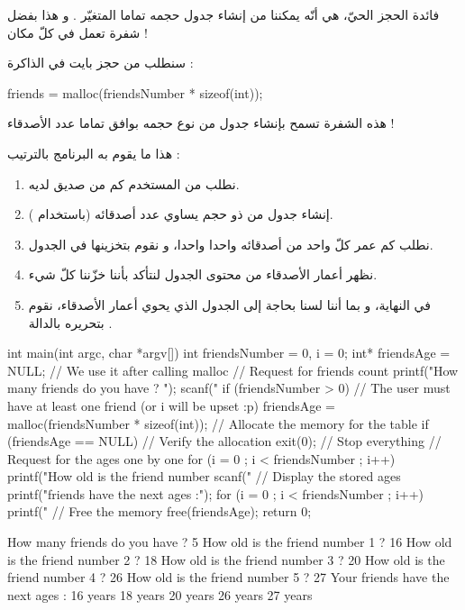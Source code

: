 فائدة الحجز الحيّ، هي أنّه يمكننا من إنشاء جدول حجمه تماما المتغيّر
.
و هذا بفضل شفرة تعمل في كلّ مكان !

سنطلب من
حجز
بايت في الذاكرة :

\begin{Csource}
friends = malloc(friendsNumber * sizeof(int));
\end{Csource}

هذه الشفرة تسمح بإنشاء جدول من نوع
حجمه بوافق تماما عدد الأصدقاء !

هذا ما يقوم به البرنامج بالترتيب :

\begin{enumerate}
  \item نطلب من المستخدم كم من صديق لديه.
  \item إنشاء جدول من
ذو حجم يساوي عدد أصدقائه (باستخدام
).
  \item نطلب كم عمر كلّ واحد من أصدقائه واحدا واحدا، و نقوم بتخزينها في الجدول.
  \item نظهر أعمار الأصدقاء من محتوى الجدول لنتأكد بأننا خزّننا كلّ شيء.
  \item في النهاية، و بما أننا لسنا بحاجة إلى الجدول الذي يحوي أعمار الأصدقاء، نقوم بتحريره بالدالة
.
\end{enumerate}

\begin{Csource}
int main(int argc, char *argv[])
{
  int friendsNumber = 0, i = 0;
  int* friendsAge = NULL; // We use it after calling malloc
  // Request for friends count
  printf("How many friends do you have ? ");
  scanf("%
  if (friendsNumber > 0) // The user must have at least one friend (or i will be upset :p)
  {
    friendsAge = malloc(friendsNumber * sizeof(int)); // Allocate the memory for the table
    if (friendsAge == NULL) // Verify the allocation
    {
      exit(0); // Stop everything
    }
    // Request for the ages one by one
    for (i = 0 ; i < friendsNumber ; i++)
    {
      printf("How old is the friend number %
      scanf("%
    }
    // Display the stored ages
    printf("\n\nYour friends have the next ages :\n");
    for (i = 0 ; i < friendsNumber ; i++)
    {
      printf("%
    }
    // Free the memory
    free(friendsAge);
  }
  return 0;
}
\end{Csource}

\begin{Console}
How many friends do you have ? 5
How old is the friend number 1 ? 16
How old is the friend number 2 ? 18
How old is the friend number 3 ? 20
How old is the friend number 4 ? 26
How old is the friend number 5 ? 27
Your friends have the next ages :
16 years
18 years
20 years
26 years
27 years
\end{Console}

